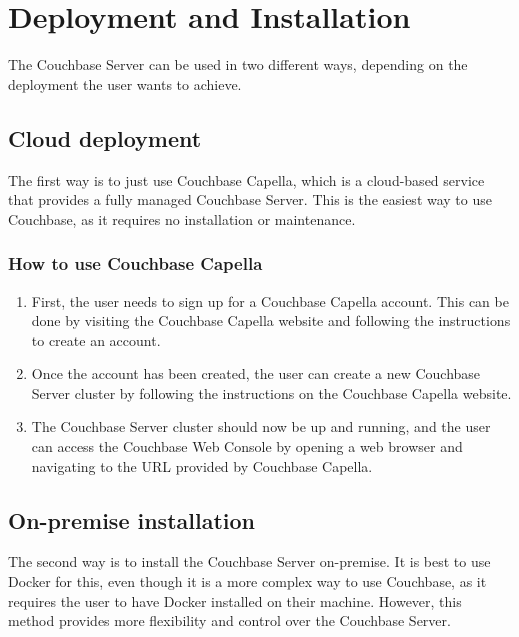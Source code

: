 \chapter{Deployment and Installation}

The Couchbase Server can be used in two different ways, depending on the deployment the user wants to achieve. 

\section{Cloud deployment}
The first way is to just use Couchbase Capella, which is a cloud-based service that provides a fully managed Couchbase Server. This is the easiest way to use Couchbase, as it requires no installation or maintenance.

\subsection{How to use Couchbase Capella}
\begin{enumerate}
    \item First, the user needs to sign up for a Couchbase Capella account. This can be done by visiting the Couchbase Capella website and following the instructions to create an account. \cite{couchbaseCapellaSignUp}
    \item Once the account has been created, the user can create a new Couchbase Server cluster by following the instructions on the Couchbase Capella website.
    \item The Couchbase Server cluster should now be up and running, and the user can access the Couchbase Web Console by opening a web browser and navigating to the URL provided by Couchbase Capella.
\end{enumerate}


\section{On-premise installation}
The second way is to install the Couchbase Server on-premise. It is best to use Docker for this, even though it is a more complex way to use Couchbase, as it requires the user to have Docker installed on their machine. However, this method provides more flexibility and control over the Couchbase Server.

